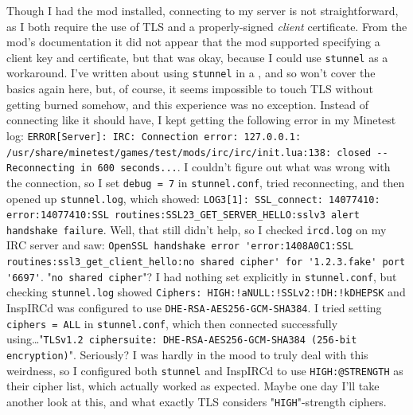 \documentclass{article}
\begin{document}
Though I had the mod installed, connecting to my server is not straightforward, as I both require the use of TLS and a properly-signed \emph{client} certificate.  From the mod's documentation it did not appear that the mod supported specifying a client key and certificate, but that was okay, because I could use \texttt{stunnel} as a workaround.  I've written about using \texttt{stunnel} in a , and so won't cover the basics again here, but, of course, it seems impossible to touch TLS without getting burned somehow, and this experience was no exception.  Instead of connecting like it should have, I kept getting the following error in my Minetest log: \verb|ERROR[Server]: IRC: Connection error: 127.0.0.1: /usr/share/minetest/games/test/mods/irc/irc/init.lua:138: closed -- Reconnecting in 600 seconds...|.  I couldn't figure out what was wrong with the connection, so I set \texttt{debug = 7} in \texttt{stunnel.conf}, tried reconnecting, and then opened up \texttt{stunnel.log}, which showed: \verb|LOG3[1]: SSL_connect: 14077410: error:14077410:SSL routines:SSL23_GET_SERVER_HELLO:sslv3 alert handshake failure|.  Well, that still didn't help, so I checked \texttt{ircd.log} on my IRC server and saw: \verb|OpenSSL handshake error 'error:1408A0C1:SSL routines:ssl3_get_client_hello:no shared cipher' for '1.2.3.fake' port '6697'|.  "\texttt{no shared cipher}"?  I had nothing set explicitly in \texttt{stunnel.conf}, but checking \texttt{stunnel.log} showed \texttt{Ciphers: HIGH:!aNULL:!SSLv2:!DH:!kDHEPSK} and InspIRCd was configured to use \texttt{DHE-RSA-AES256-GCM-SHA384}.  I tried setting \texttt{ciphers = ALL} in \texttt{stunnel.conf}, which then connected successfully using\ldots "\texttt{TLSv1.2 ciphersuite: DHE-RSA-AES256-GCM-SHA384 (256-bit encryption)}".  Seriously?  I was hardly in the mood to truly deal with this weirdness, so I configured both \texttt{stunnel} and InspIRCd to use \texttt{HIGH:@STRENGTH} as their cipher list, which actually worked as expected.  Maybe one day I'll take another look at this, and what exactly TLS considers "\texttt{HIGH}"-strength ciphers.
\end{document}
